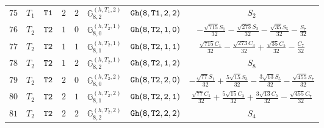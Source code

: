 \documentclass[fleqn,8pt]{jsarticle}
\begin{document}
\begin{table}[ht!]
\begin{center}
\begin{tabular}{cccccccc}
$ 75 $ & $ T_{1} $ & $ {\tt T1} $ & $ 2 $ & $ 2 $ & $ \mathbb{G}_{8,2}^{(h,T_{1},2)} $ & $ {\tt Gh(8,T1,2,2)} $ & $ S_{2} $ \\
$ 76 $ & $ T_{2} $ & $ {\tt T2} $ & $ 1 $ & $ 0 $ & $ \mathbb{G}_{8,0}^{(h,T_{2},1)} $ & $ {\tt Gh(8,T2,1,0)} $ & $ - \frac{\sqrt{715} S_{1}}{32} - \frac{\sqrt{273} S_{3}}{32} - \frac{\sqrt{35} S_{5}}{32} - \frac{S_{7}}{32} $ \\
$ 77 $ & $ T_{2} $ & $ {\tt T2} $ & $ 1 $ & $ 1 $ & $ \mathbb{G}_{8,1}^{(h,T_{2},1)} $ & $ {\tt Gh(8,T2,1,1)} $ & $ \frac{\sqrt{715} C_{1}}{32} - \frac{\sqrt{273} C_{3}}{32} + \frac{\sqrt{35} C_{5}}{32} - \frac{C_{7}}{32} $ \\
$ 78 $ & $ T_{2} $ & $ {\tt T2} $ & $ 1 $ & $ 2 $ & $ \mathbb{G}_{8,2}^{(h,T_{2},1)} $ & $ {\tt Gh(8,T2,1,2)} $ & $ S_{8} $ \\
$ 79 $ & $ T_{2} $ & $ {\tt T2} $ & $ 2 $ & $ 0 $ & $ \mathbb{G}_{8,0}^{(h,T_{2},2)} $ & $ {\tt Gh(8,T2,2,0)} $ & $ - \frac{\sqrt{77} S_{1}}{32} + \frac{5 \sqrt{15} S_{3}}{32} - \frac{3 \sqrt{13} S_{5}}{32} - \frac{\sqrt{455} S_{7}}{32} $ \\
$ 80 $ & $ T_{2} $ & $ {\tt T2} $ & $ 2 $ & $ 1 $ & $ \mathbb{G}_{8,1}^{(h,T_{2},2)} $ & $ {\tt Gh(8,T2,2,1)} $ & $ \frac{\sqrt{77} C_{1}}{32} + \frac{5 \sqrt{15} C_{3}}{32} + \frac{3 \sqrt{13} C_{5}}{32} - \frac{\sqrt{455} C_{7}}{32} $ \\
$ 81 $ & $ T_{2} $ & $ {\tt T2} $ & $ 2 $ & $ 2 $ & $ \mathbb{G}_{8,2}^{(h,T_{2},2)} $ & $ {\tt Gh(8,T2,2,2)} $ & $ S_{4} $ \\
 \hline \hline
\end{tabular}
\end{center}
\end{table}
\end{document}
